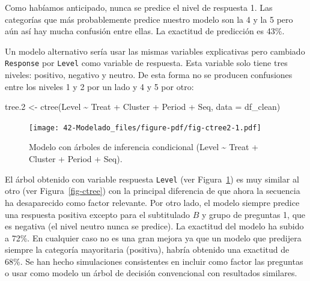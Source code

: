 \documentclass[
  12pt,
  a4paper,
  extrafontsizes,
  onecolumn,
  openright]{memoir}
\newenvironment{Shaded}{\begin{snugshade}}{\end{snugshade}}
\newcommand{\AttributeTok}[1]{\textcolor[rgb]{0.40,0.45,0.13}{#1}}
\newcommand{\FloatTok}[1]{\textcolor[rgb]{0.68,0.00,0.00}{#1}}
\newcommand{\FunctionTok}[1]{\textcolor[rgb]{0.28,0.35,0.67}{#1}}
\newcommand{\NormalTok}[1]{\textcolor[rgb]{0.00,0.23,0.31}{#1}}
\newcommand{\OtherTok}[1]{\textcolor[rgb]{0.00,0.23,0.31}{#1}}
\newcommand{\SpecialCharTok}[1]{\textcolor[rgb]{0.37,0.37,0.37}{#1}}
\begin{document}
\normalsize

Como habíamos anticipado, nunca se predice el nivel de respuesta 1. Las
categorías que más probablemente predice nuestro modelo son la 4 y la 5
pero aún así hay mucha confusión entre ellas. La exactitud de predicción
es 43\%.

Un modelo alternativo sería usar las mismas variables explicativas pero
cambiado \texttt{Response} por \texttt{Level} como variable de
respuesta. Esta variable solo tiene tres niveles: positivo, negativo y
neutro. De esta forma no se producen confusiones entre los niveles 1 y 2
por un lado y 4 y 5 por otro:

\scriptsize

\begin{Shaded}
\begin{Highlighting}[]
\NormalTok{tree}\FloatTok{.2} \OtherTok{\textless{}{-}} \FunctionTok{ctree}\NormalTok{(Level }\SpecialCharTok{\textasciitilde{}}\NormalTok{ Treat }\SpecialCharTok{+}\NormalTok{ Cluster }\SpecialCharTok{+}\NormalTok{ Period }\SpecialCharTok{+}\NormalTok{ Seq, }\AttributeTok{data =}\NormalTok{ df\_clean)}
\end{Highlighting}
\end{Shaded}

\normalsize

\begin{figure}[h]

{\centering \texttt{[image: 42-Modelado\_files/figure-pdf/fig-ctree2-1.pdf]}

}

\caption{\label{fig-ctree2}Modelo con árboles de inferencia condicional
(Level \textasciitilde{} Treat + Cluster + Period + Seq).}

\end{figure}

El árbol obtenido con variable respuesta \texttt{Level} (ver
Figura~\ref{fig-ctree2}) es muy similar al otro (ver
Figura~\ref{fig-ctree}) con la principal diferencia de que ahora la
secuencia ha desaparecido como factor relevante. Por otro lado, el
modelo siempre predice una respuesta positiva excepto para el
subtitulado \(B\) y grupo de preguntas 1, que es negativa (el nivel
neutro nunca se predice). La exactitud del modelo ha subido a 72\%. En
cualquier caso no es una gran mejora ya que un modelo que predijera
siempre la categoría mayoritaria (positiva), habría obtenido una
exactitud de 68\%. Se han hecho simulaciones consistentes en incluir
como factor las preguntas o usar como modelo un árbol de decisión
convencional con resultados similares.
\end{document}
